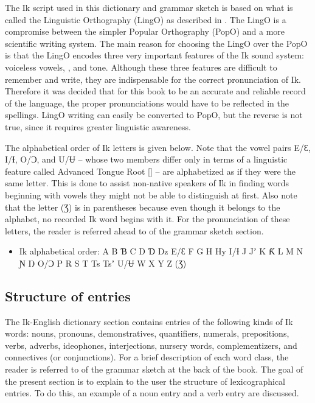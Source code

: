 The Ik script used in this dictionary and grammar sketch is based on what is called the Linguistic Orthography (LingO) as described in \citet{Schrock2015}. The LingO is a compromise between the simpler Popular Orthography (PopO) and a more scientific writing system. The main reason for choosing the LingO over the PopO is that the LingO encodes three very important features of the Ik sound system: voiceless vowels, , and tone. Although these three features are difficult to remember and write, they are indispensable for the correct pronunciation of Ik. Therefore it was decided that for this book to be an accurate and reliable record of the language, the proper pronunciations would have to be reflected in the spellings. LingO writing can easily be converted to PopO, but the reverse is not true, since it requires greater linguistic awareness.

The alphabetical order of Ik letters is given below. Note that the vowel pairs E/Ɛ, I/Ɨ, O/Ɔ, and U/Ʉ – whose two members differ only in terms of a linguistic feature called Advanced Tongue Root [] – are alphabetized as if they were the same letter. This is done to assist non-native speakers of Ik in finding words beginning with vowels they might not be able to distinguish at first. Also note that the letter (Ʒ) is in parentheses because even though it belongs to the alphabet, no recorded Ik word begins with it. For the pronunciation of these letters, the reader is referred ahead to  of the grammar sketch section.
 
\begin{itemize}
\item  Ik alphabetical order: A B Ɓ C D Ɗ Dz E/Ɛ F G H Hy I/Ɨ J Jʼ K Ƙ L M N Ɲ Ŋ O/Ɔ P R S T Ts Tsʼ U/Ʉ W X Y Z (Ʒ)
\end{itemize}
 
\subsection{Structure of entries}\label{sec:1.3.2}

The Ik-English dictionary section contains entries of the following kinds of Ik words\textsc{:} nouns, pronouns, demonstratives, quantifiers, numerals, prepositions, verbs, adverbs, ideophones, interjections, nursery words, complementizers, and connectives (or conjunctions). For a brief description of each word class, the reader is referred to  of the grammar sketch at the back of the book. The goal of the present section is to explain to the user the structure of lexicographical entries. To do this, an example of a noun entry and a verb entry are discussed.

